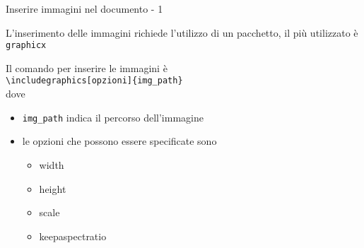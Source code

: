 \begin{frame}{Inserire immagini nel documento - 1}
	
L'inserimento delle immagini richiede l'utilizzo di un pacchetto, il più
utilizzato è \texttt{graphicx}

\vfill

Il comando per inserire le immagini è \\
\texttt{\textbackslash{}includegraphics[opzioni]\{img\_path\}} \\
dove

\begin{itemize}
	\item \texttt{img\_path} indica il percorso dell'immagine
	\item le opzioni che possono essere specificate sono
	\begin{itemize}
		\item width
		\item height
		\item scale
		\item keepaspectratio
	\end{itemize}
\end{itemize}

\end{frame}

